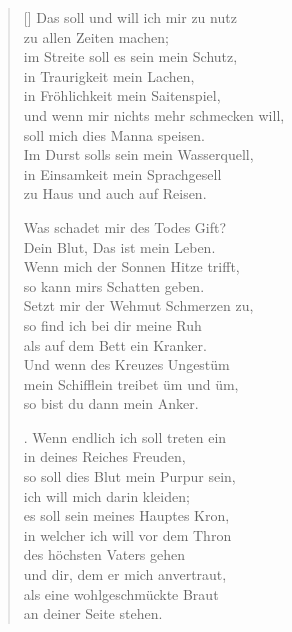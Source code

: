 \begin{multicols}{2}
\begin{verse}[\versewidth]
 Das soll und will ich mir zu nutz\\
zu allen Zeiten machen;\\
im Streite soll es sein mein Schutz,\\
in Traurigkeit mein Lachen,\\
in Fröhlichkeit mein Saitenspiel,\\
und wenn mir nichts mehr schmecken will,\\
soll mich dies Manna speisen.\\
Im Durst solls sein mein Wasserquell,\\
in Einsamkeit mein Sprachgesell\\
zu Haus und auch auf Reisen.
 
 Was schadet mir des Todes Gift?\\
Dein Blut, Das ist mein Leben.\\
Wenn mich der Sonnen Hitze trifft,\\
so kann mirs Schatten geben.\\
Setzt mir der Wehmut Schmerzen zu,\\
so find ich bei dir meine Ruh\\
als auf dem Bett ein Kranker.\\
Und wenn des Kreuzes Ungestüm\\
mein Schifflein treibet üm und üm,\\
so bist du dann mein Anker.
 
. Wenn endlich ich soll treten ein\\
in deines Reiches Freuden,\\
so soll dies Blut mein Purpur sein,\\
ich will mich darin kleiden;\\
es soll sein meines Hauptes Kron,\\
in welcher ich will vor dem Thron\\
des höchsten Vaters gehen\\
und dir, dem er mich anvertraut,\\
als eine wohlgeschmückte Braut\\
an deiner Seite stehen.

\end{verse}
\end{multicols}
